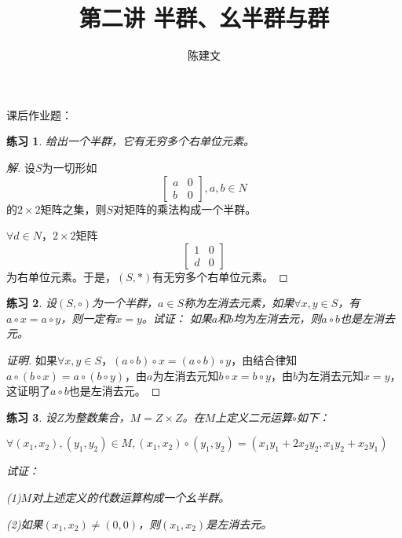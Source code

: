 \documentclass{article}
\newtheorem{Exercise}{练习}
\begin{document}
\begin{CJK*}{UTF8}{gbsn}
  \title{第二讲 半群、幺半群与群}
  \author{陈建文}
  \maketitle



  课后作业题：

\begin{Exercise}
  给出一个半群，它有无穷多个右单位元素。
\end{Exercise}
\begin{proof}[解]
  设$S$为一切形如
  \[\begin{bmatrix}
    a&0\\
    b&0
  \end{bmatrix},a,b\in N\]
的$2\times 2$矩阵之集，则$S$对矩阵的乘法构成一个半群。

$\forall d\in N$，$2\times 2$矩阵
\[\begin{bmatrix}1&0\\d&0\end{bmatrix}\]
为右单位元素。于是，$(S,*)$有无穷多个右单位元素。  
\end{proof}
\begin{Exercise}
  设$(S,\circ)$为一个半群，$a\in S$称为左消去元素，如果$\forall x, y\in S$，有$a\circ x=a\circ y$，则一定有$x=y$。试证：
  如果$a$和$b$均为左消去元，则$a\circ b$也是左消去元。
\end{Exercise}
\begin{proof}[证明]
  如果$\forall x, y\in S$，$(a\circ b)\circ x=(a\circ b)\circ y$，由结合律知$a\circ (b\circ x)=a\circ (b\circ y)$，由$a$为左消去元知$b\circ x=b\circ y$，由$b$为左消去元知$x=y$，这证明了$a\circ b$也是左消去元。
\end{proof}
\begin{Exercise}
  设$Z$为整数集合，$M=Z\times Z$。在$M$上定义二元运算$\circ$如下：

  $\forall (x_1,x_2), (y_1,y_2)\in M, (x_1,x_2)\circ (y_1,y_2)=(x_1y_1+2x_2y_2,x_1y_2+x_2y_1)$

  试证：

  (1)$M$对上述定义的代数运算构成一个幺半群。

  (2)如果$(x_1,x_2)\neq (0,0)$，则$(x_1,x_2)$是左消去元。


\end{Exercise}
\end{CJK*}
\end{document}
